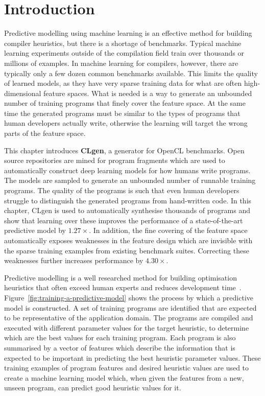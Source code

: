 \section{Introduction}

Predictive modelling using machine learning is an effective method for building compiler heuristics, but there is a shortage of benchmarks. Typical machine learning experiments outside of the compilation field train over thousands or millions of examples. In machine learning for compilers, however, there are typically only a few dozen common benchmarks available. This limits the quality of learned models, as they have very sparse training data for what are often high-dimensional feature spaces. What is needed is a way to generate an unbounded number of training programs that finely cover the feature space. At the same time the generated programs must be similar to the types of programs that human developers actually write, otherwise the learning will target the wrong parts of the feature space.

This chapter introduces \textbf{CLgen}, a generator for OpenCL benchmarks. Open source repositories are mined for program fragments which are used to automatically construct deep learning models for how humans write programs. The models are sampled to generate an unbounded number of runnable training programs. The quality of the programs is such that even human developers struggle to distinguish the generated programs from hand-written code. In this chapter, CLgen is used to automatically synthesise thousands of programs and show that learning over these improves the performance of a state-of-the-art predictive model by $1.27\times$. In addition, the fine covering of the feature space automatically exposes weaknesses in the feature design which are invisible with the sparse training examples from existing benchmark suites. Correcting these weaknesses further increases performance by $4.30\times$.

Predictive modelling is a well researched method for building optimisation heuristics that often exceed human experts and reduces development time~\cite{Micolet2016,Wang2014c,Magni2014,Cummins2016,Wang2009,Wen2015,Wang2010,Falch2015,Collins2012,Leather2014,Ogilvie2014a}. Figure~\ref{fig:training-a-predictive-model} shows the process by which a predictive model is constructed. A set of training programs are identified that are expected to be representative of the application domain. The programs are compiled and executed with different parameter values for the target heuristic, to determine which are the best values for each training program. Each program is also summarised by a vector of features which describe the information that is expected to be important in predicting the best heuristic parameter values. These training examples of program features and desired heuristic values are used to create a machine learning model which, when given the features from a new, unseen program, can predict good heuristic values for it.

